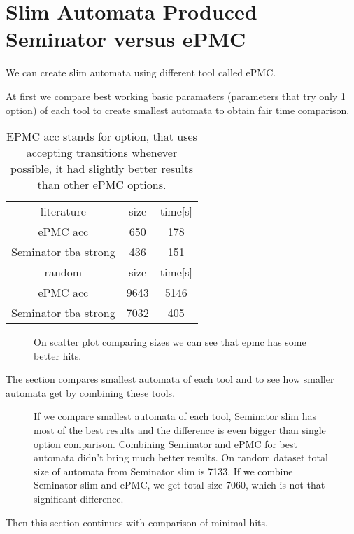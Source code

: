 \documentclass[
	digital,
nolof, nolot
]{fithesis3}
\newcommand{\hlineny}{\hline}
\begin{document}
		\section{Slim Automata Produced Seminator versus ePMC}
		We can create slim automata using different tool called ePMC.
		
		At first we compare best working basic paramaters (parameters that try only 1 option) of each tool to create smallest automata to obtain fair time comparison.
	
	\begin{table}[ht]
		\centering
		\label{table:epmc-seminator-1}
		\caption{EPMC acc stands for option, that uses accepting transitions whenever possible, it had slightly better results than other ePMC options. }
		\begin{tabular}{ |c||c|c| } 
			\hline
			literature&size&time[s]\\
			\hhline{|===|}
			ePMC acc&650 &178 \\
			\hline
			Seminator tba strong &436 &151 \\
			\hlineny
			\hline
			random&size&time[s]\\
			\hhline{|===|}
			ePMC acc&9643 & 5146\\
			\hline
			Seminator tba strong &7032 &405 \\
			\hlineny
		\end{tabular}
	\end{table}
	\begin{figure}[ht]
		\centering
		\label{scatter:slim-epmc-1}
		\caption{On scatter plot comparing sizes we can see that epmc has some better hits.}
		\begin{tikzpicture}
			
		\end{tikzpicture}
	\end{figure}
	
	
		The section compares smallest automata of each tool and to see how smaller automata get by combining these tools.
	
\begin{figure}[ht]
	\centering
	\label{scatter:slim-epmc}
	\caption{If we compare smallest automata of each tool, Seminator slim has most of the best results and the difference is even bigger than single option comparison. Combining Seminator and ePMC for best automata didn't bring much better results. On random dataset total size of automata from Seminator slim is 7133. If we combine Seminator slim and ePMC, we get total size 7060, which is not that significant difference.}
	\begin{tikzpicture}
		
	\end{tikzpicture}
\end{figure}
Then this section continues with comparison of minimal hits.
\end{document}
